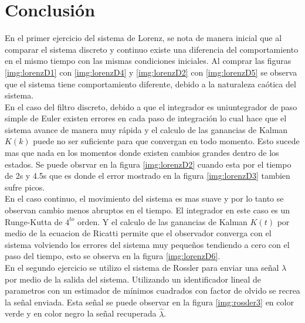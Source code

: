 \section*{Conclusión}

En el primer ejercicio del sistema de Lorenz, se nota de manera inicial que al comparar el sistema discreto y continuo existe una diferencia del comportamiento en el mismo tiempo con las mismas condiciones iniciales. Al comprar las figuras \ref{img:lorenzD1} con \ref{img:lorenzD4} y \ref{img:lorenzD2} con \ref{img:lorenzD5} se observa que el sistema tiene comportamiento diferente, debido a la naturaleza caótica del sistema.\\

En el caso del filtro discreto, debido a que el integrador es uniuntegrador de paso simple de Euler existen errores en cada paso de integración lo cual hace que el sistema avance de manera muy rápida y el calculo de las ganancias de Kalman $K(k)$ puede no ser suficiente para que convergan en todo momento. Esto sucede mas que nada en los momentos donde existen cambios grandes dentro de los estados. Se puede obsrvar en la figura \ref{img:lorenzD2} cuando esta por el tiempo de 2s y 4.5s que es donde el error mostrado en la figura \ref{img:lorenzD3} tambien sufre picos.\\

En el caso continuo, el movimiento del sistema es mas suave y por lo tanto se observan cambio menos abruptos en el tiempo. El integrador en este caso es un Runge-Kutta de $4^{to}$ orden. Y el calculo de las ganancias de Kalman $K(t)$ por medio de la ecuacion de Ricatti permite que el observador converga con el sistema volviendo los errores del sistema muy pequeños tendiendo a cero con el paso del tiempo, esto se observa en la figura \ref{img:lorenzD6}.\\

En el segundo ejercicio se utilizo el sistema de Rossler para enviar una señal $\lambda$ por medio de la salida del sistema. Utilizando un identificador lineal de parametros con un estimador de mínimos cuadrados con factor de olvido se recrea la señal enviada. Esta señal se puede observar en la figura \ref{img:rossler3} en color verde y en color negro la señal recuperada $\hat{\lambda}$.

